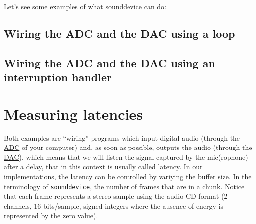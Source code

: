 Let's see some examples of what sounddevice can do:

\subsection*{Wiring the ADC and the DAC using a loop}


\subsection*{Wiring the ADC and the DAC using an interruption handler}


\section{Measuring latencies}
Both examples are ``wiring'' programs which input digital audio
(through the
\href{https://en.wikipedia.org/wiki/Analog-to-digital_converter}{ADC}
of your computer) and, as soon as possible, outputs the audio (through
the
\href{https://en.wikipedia.org/wiki/Digital-to-analog_converter}{DAC}), which means that we will listen the signal captured by the mic(rophone) after a delay, that in this context is usually called \href{https://en.wikipedia.org/wiki/Latency_(engineering)}{latency}. In our implementations, the latency can be controlled by variying the buffer size. In the terminology of \texttt{sounddevice}, the number of \href{https://python-sounddevice.readthedocs.io/en/0.3.12/api.html}{frames} that are in a chunk. Notice that each frame represents a stereo sample using the audio CD format (2 channels, 16 bits/sample, signed integers where the ausence of energy is represented by the zero value).

